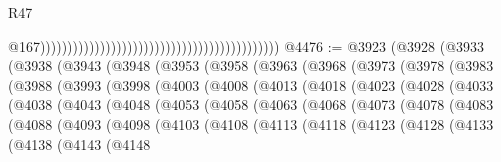 \begin{lexlean}{R47}
\begin{coremodule}
                                                                                            @167))))))))))))))))))))))))))))))))))))))))))))
@4476 := @3923
    (@3928
      (@3933
        (@3938
          (@3943
            (@3948
              (@3953
                (@3958
                  (@3963
                    (@3968
                      (@3973
                        (@3978
                          (@3983
                            (@3988
                              (@3993
                                (@3998
                                  (@4003
                                    (@4008
                                      (@4013
                                        (@4018
                                          (@4023
                                            (@4028
                                              (@4033
                                                (@4038
                                                  (@4043
                                                    (@4048
                                                      (@4053
                                                        (@4058
                                                          (@4063
                                                            (@4068
                                                              (@4073
                                                                (@4078
                                                                  (@4083
                                                                    (@4088
                                                                      (@4093
                                                                        (@4098
                                                                          (@4103
                                                                            (@4108
                                                                              (@4113
                                                                                (@4118
                                                                                  (@4123
                                                                                    (@4128
                                                                                      (@4133
                                                                                        (@4138
                                                                                          (@4143
                                                                                            (@4148

\end{coremodule}
\end{lexlean}
